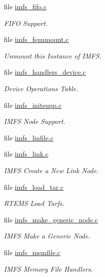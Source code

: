 \begin{DoxyCompactItemize}
file \mbox{\hyperlink{imfs__fifo_8c}{imfs\+\_\+fifo.\+c}}
\begin{DoxyCompactList}\small\item\em F\+I\+FO Support. \end{DoxyCompactList}\item 
file \mbox{\hyperlink{imfs__fsunmount_8c}{imfs\+\_\+fsunmount.\+c}}
\begin{DoxyCompactList}\small\item\em Unmount this Instance of I\+M\+FS. \end{DoxyCompactList}\item 
file \mbox{\hyperlink{imfs__handlers__device_8c}{imfs\+\_\+handlers\+\_\+device.\+c}}
\begin{DoxyCompactList}\small\item\em Device Operations Table. \end{DoxyCompactList}\item 
file \mbox{\hyperlink{imfs__initsupp_8c}{imfs\+\_\+initsupp.\+c}}
\begin{DoxyCompactList}\small\item\em I\+M\+FS Node Support. \end{DoxyCompactList}\item 
file \mbox{\hyperlink{imfs__linfile_8c}{imfs\+\_\+linfile.\+c}}
\item 
file \mbox{\hyperlink{imfs__link_8c}{imfs\+\_\+link.\+c}}
\begin{DoxyCompactList}\small\item\em I\+M\+FS Create a New Link Node. \end{DoxyCompactList}\item 
file \mbox{\hyperlink{imfs__load__tar_8c}{imfs\+\_\+load\+\_\+tar.\+c}}
\begin{DoxyCompactList}\small\item\em R\+T\+E\+MS Load Tarfs. \end{DoxyCompactList}\item 
file \mbox{\hyperlink{imfs__make__generic__node_8c}{imfs\+\_\+make\+\_\+generic\+\_\+node.\+c}}
\begin{DoxyCompactList}\small\item\em I\+M\+FS Make a Generic Node. \end{DoxyCompactList}\item 
file \mbox{\hyperlink{imfs__memfile_8c}{imfs\+\_\+memfile.\+c}}
\begin{DoxyCompactList}\small\item\em I\+M\+FS Memory File Handlers. \end{DoxyCompactList}\item 

\end{DoxyCompactItemize}
